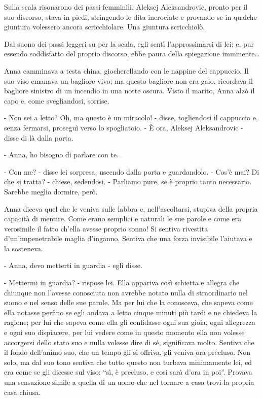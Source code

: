 Sulla scala risonarono dei passi femminili. Aleksej Aleksandrovic, pronto per il suo discorso, stava in piedi, stringendo le dita incrociate e provando se in qualche giuntura volessero ancora scricchiolare. Una giuntura scricchiolò. 

Dal suono dei passi leggeri su per la scala, egli sentì l'approssimarsi di lei; e, pur essendo soddisfatto del proprio discorso, ebbe paura della spiegazione imminente\ldots{} 

Anna camminava a testa china, giocherellando con le nappine del cappuccio. Il suo viso emanava un bagliore vivo; ma questo bagliore non era gaio, ricordava il bagliore sinistro di un incendio in una notte oscura. Visto il marito, Anna alzò il capo e, come svegliandosi, sorrise. 

- Non sei a letto? Oh, ma questo è un miracolo! - disse, togliendosi il cappuccio e, senza fermarsi, proseguì verso lo spogliatoio. - È ora, Aleksej Aleksandrovic - disse di là dalla porta. 

- Anna, ho bisogno di parlare con te. 

- Con me? - disse lei sorpresa, uscendo dalla porta e guardandolo. - Cos'è mai? Di che si tratta? - chiese, sedendosi. - Parliamo pure, se è proprio tanto necessario. Sarebbe meglio dormire, però. 

Anna diceva quel che le veniva sulle labbra e, nell'ascoltarsi, stupiva della propria capacità di mentire. Come erano semplici e naturali le sue parole e come era verosimile il fatto ch'ella avesse proprio sonno! Si sentiva rivestita d'un'impenetrabile maglia d'inganno. Sentiva che una forza invisibile l'aiutava e la sosteneva. 

- Anna, devo metterti in guardia - egli disse. 

- Mettermi in guardia? - rispose lei. Ella appariva così schietta e allegra che chiunque non l'avesse conosciuta non avrebbe notato nulla di straordinario nel suono e nel senso delle sue parole. Ma per lui che la conosceva, che sapeva come ella notasse perfino se egli andava a letto cinque minuti più tardi e ne chiedeva la ragione; per lui che sapeva come ella gli confidasse ogni sua gioia, ogni allegrezza e ogni suo dispiacere, per lui vedere come in questo momento ella non volesse accorgersi dello stato suo e nulla volesse dire di sé, significava molto. Sentiva che il fondo dell'animo suo, che un tempo gli si offriva, gli veniva ora precluso. Non solo, ma dal suo tono sentiva che tutto questo non turbava minimamente lei, ed era come se gli dicesse sul viso: ``sì, è precluso, e così sarà d'ora in poi''. Provava una sensazione simile a quella di un uomo che nel tornare a casa trovi la propria casa chiusa. 

